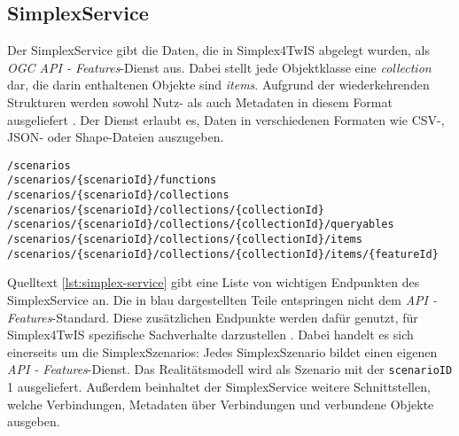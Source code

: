 \subsection{SimplexService}
\label{sec:simplex-service}

Der SimplexService gibt die Daten, die in Simplex4TwIS abgelegt wurden, als \textit{OGC API - Features}-Dienst aus. Dabei stellt jede Objektklasse eine \textit{collection} dar, die darin enthaltenen Objekte sind \textit{items}. Aufgrund der wiederkehrenden Strukturen werden sowohl Nutz- als auch Metadaten in diesem Format ausgeliefert \parencite{grossmannEnvVisioService2022}. Der Dienst erlaubt es, Daten in verschiedenen Formaten wie \acs{CSV}-, \acs{JSON}- oder Shape-Dateien auszugeben.

\begin{lstlisting}[float=!ht,language=simplexservice,caption={Ausgewählte Endpunkte des SimplexService. Schwarz dargestellte Abschnitte sind Teil des \textit{OGC API - Features}-Standard, während die blauen Teile vom SimplexService hinzugefügt wurden. \parencite{simplex4datagmbhSimplexServiceDokumenation}},label=lst:simplex-service]
/scenarios
/scenarios/{scenarioId}/functions
/scenarios/{scenarioId}/collections
/scenarios/{scenarioId}/collections/{collectionId}
/scenarios/{scenarioId}/collections/{collectionId}/queryables
/scenarios/{scenarioId}/collections/{collectionId}/items
/scenarios/{scenarioId}/collections/{collectionId}/items/{featureId}
\end{lstlisting}

Quelltext \ref{lst:simplex-service} gibt eine Liste von wichtigen Endpunkten des SimplexService an. Die in blau dargestellten Teile entspringen nicht dem \textit{API - Features}-Standard. Diese zusätzlichen Endpunkte werden dafür genutzt, für Simplex4TwIS spezifische Sachverhalte darzustellen \parencite{grossmannEnvVisioService2022}. Dabei handelt es sich einerseits um die SimplexSzenarios: Jedes SimplexSzenario bildet einen eigenen \textit{API - Features}-Dienst. Das Realitätsmodell wird als Szenario mit der \texttt{scenarioID} 1 ausgeliefert. Außerdem beinhaltet der SimplexService weitere Schnittstellen, welche Verbindungen, Metadaten über Verbindungen und verbundene Objekte ausgeben.
